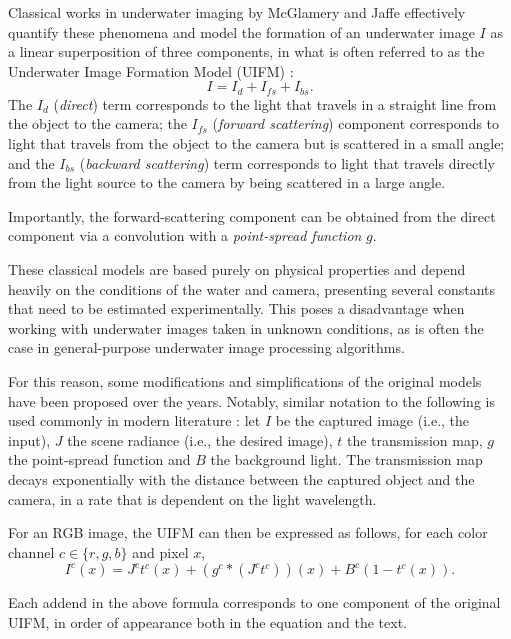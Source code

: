 \documentclass[twocolumn,twoside,a4paper,10pt]{IEEEtran}
\begin{document}
Classical works in underwater imaging by McGlamery \cite{10.1117/12.958279} and Jaffe \cite{50695} effectively quantify these phenomena and model the formation of an underwater image \(I\) as a linear superposition of three components, in what is often referred to as the Underwater Image Formation Model (UIFM) \cite{xie2021variational}:
\[
  I = I_{d} + I_{fs} + I_{bs}
.\]
The \(I_d\) (\textit{direct}) term corresponds to the light that travels in a straight line from the object to the camera; the \(I_{fs}\) (\textit{forward scattering}) component corresponds to light that travels from the object to the camera but is scattered in a small angle; and the \(I_{bs}\) (\textit{backward scattering}) term corresponds to light that travels directly from the light source to the camera by being scattered in a large angle.

Importantly, the forward-scattering component can be obtained from the direct component via a convolution with a \textit{point-spread function} \(g\).

These classical models are based purely on physical properties and depend heavily on the
conditions of the water and camera, presenting several constants that need to be
estimated experimentally. This poses a disadvantage when working with
underwater images taken in unknown conditions, as is often the case in
general-purpose underwater image processing algorithms.

For this reason, some modifications and simplifications of the original models
have been proposed over the years. Notably, similar notation to the following is used commonly in modern literature \cite{xie2021variational,ancuti2017color}: let \(I\) be the captured image (i.e., the input), \(J\) the scene radiance (i.e., the desired image), \(t\) the transmission map, \(g\) the point-spread function and \(B\) the background light. The transmission map decays exponentially with the distance between the captured object and the camera, in a rate that is dependent on the light wavelength.

For an RGB image, the UIFM can then be expressed as follows, for each color channel \(c\in\{r, g, b\}\) and pixel \(x\),
\begin{equation}\label{eq:uifm}
  I^c(x) = J^ct^c(x) + \left(g^c\ast\left(J^c t^c\right)\right) (x) +  B^c\left(1 - t^c(x)\right).
\end{equation}

Each addend in the above formula corresponds to one component of the original UIFM, in order of appearance both in the equation and the text.
\end{document}
